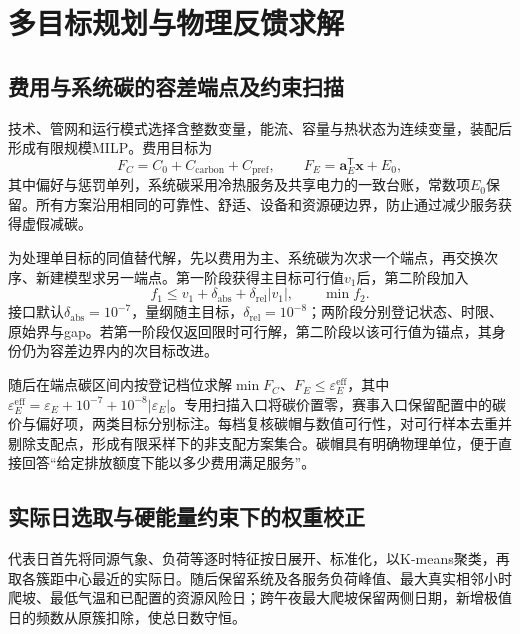 \section{多目标规划与物理反馈求解}

\subsection{费用与系统碳的容差端点及约束扫描}

技术、管网和运行模式选择含整数变量，能流、容量与热状态为连续变量，装配后形成有限规模MILP。费用目标为
\begin{equation}
F_C=C_0+C_{\mathrm{carbon}}+C_{\mathrm{pref}},\qquad F_E=\boldsymbol a_E^\mathsf T\boldsymbol x+E_0,
\label{eq:scoring-objectives}
\end{equation}
其中偏好与惩罚单列，系统碳采用冷热服务及共享电力的一致台账，常数项$E_0$保留。所有方案沿用相同的可靠性、舒适、设备和资源硬边界，防止通过减少服务获得虚假减碳。

为处理单目标的同值替代解，先以费用为主、系统碳为次求一个端点，再交换次序、新建模型求另一端点。第一阶段获得主目标可行值$v_1$后，第二阶段加入
\begin{equation}
f_1\leq v_1+\delta_{\mathrm{abs}}+\delta_{\mathrm{rel}}|v_1|,
\qquad\min f_2.
\label{eq:scoring-endpoint}
\end{equation}
接口默认$\delta_{\mathrm{abs}}=10^{-7}$，量纲随主目标，$\delta_{\mathrm{rel}}=10^{-8}$；两阶段分别登记状态、时限、原始界与gap。若第一阶段仅返回限时可行解，第二阶段以该可行值为锚点，其身份仍为容差边界内的次目标改进。

随后在端点碳区间内按登记档位求解$\min F_C$、$F_E\leq\varepsilon_E^{\mathrm{eff}}$，其中$\varepsilon_E^{\mathrm{eff}}=\varepsilon_E+10^{-7}+10^{-8}|\varepsilon_E|$。专用扫描入口将碳价置零，赛事入口保留配置中的碳价与偏好项，两类目标分别标注。每档复核碳帽与数值可行性，对可行样本去重并剔除支配点，形成有限采样下的非支配方案集合。碳帽具有明确物理单位，便于直接回答“给定排放额度下能以多少费用满足服务”。

\subsection{实际日选取与硬能量约束下的权重校正}

代表日首先将同源气象、负荷等逐时特征按日展开、标准化，以K-means聚类，再取各簇距中心最近的实际日。随后保留系统及各服务负荷峰值、最大真实相邻小时爬坡、最低气温和已配置的资源风险日；跨午夜最大爬坡保留两侧日期，新增极值日的频数从原簇扣除，使总日数守恒。

